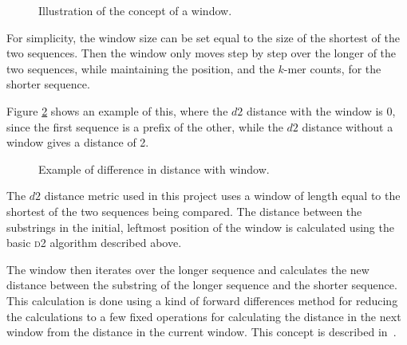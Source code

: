 \begin{figure}[H]
\centering
{}
\caption{Illustration of the concept of a window.}
\label{fig:d2_window_concept}
\end{figure}

For simplicity, the window size can be set equal to the size of the shortest of
the two sequences. Then the window only moves step by step over the longer of
the two sequences, while maintaining the position, and the $k$-mer counts, for
the shorter sequence.

Figure \ref{fig:d2_window_example} shows an example of this, where the $d2$
distance with the window is 0, since the first sequence is a prefix of the
other, while the $d2$ distance without a window gives a distance of 2.

\begin{figure}[H]
\centering
{}
\caption{Example of difference in distance with window.}
\label{fig:d2_window_example}
\end{figure}

The $d2$ distance metric used in this project uses a window of length equal to
the shortest of the two sequences being compared. The distance between the
substrings in the initial, leftmost position of the window is calculated using
the basic \textsc{d2} algorithm described above.

The window then iterates over the longer sequence and calculates the new
distance between the substring of the longer sequence and the shorter sequence.
This calculation is done using a kind of forward differences method for
reducing the calculations to a few fixed operations for calculating the
distance in the next window from the distance in the current window. This
concept is described in~\cite{hazelhurst}.


